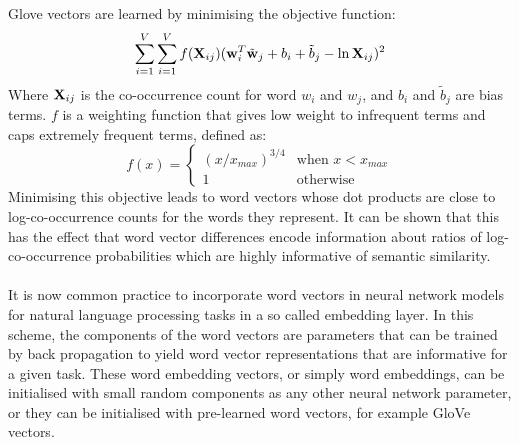  Glove vectors are learned by minimising the objective function:
$$
\sum\limits_{i=1}^V\sum\limits_{i=1}^V f(\mathbf{X}_{ij})(\mathbf{w}_i^T\tilde{\mathbf{w}}_j + b_i + \tilde{b}_j - \ln \mathbf{X}_{ij})^2
$$
Where $\mathbf{X}_{ij}$ is the co-occurrence count for word $w_i$ and $w_j$, and $b_i$ and $\tilde{b}_j$ are bias terms. $f$ is a weighting function that gives low weight to infrequent terms and caps extremely frequent terms, defined as:
$$
f(x) = \begin{cases}
	(x / x_{max})^{3/4} & \text{when $x < x_{max}$} \\
	1 & \text{otherwise}
\end{cases}
$$
Minimising this objective leads to word vectors whose dot products are close to log-co-occurrence counts for the words they represent. It can be shown that this has the effect that word vector differences encode information about ratios of log-co-occurrence probabilities which are highly informative of semantic similarity.
\\\\
It is now common practice to incorporate word vectors in neural network models for natural language processing tasks in a so called embedding layer. In this scheme, the components of the word vectors are parameters that can be trained by back propagation to yield word vector representations that are informative for a given task. These word embedding vectors, or simply word embeddings, can be initialised with small random components as any other neural network parameter, or they can be initialised with pre-learned word vectors, for example GloVe vectors.